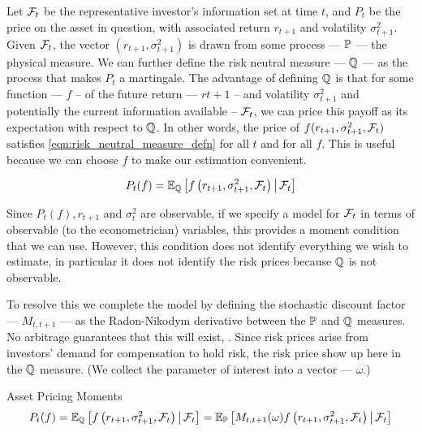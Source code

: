 \documentclass[11pt, letterpaper, twoside, final]{article}
\begin{document}
Let $\mathcal{F}_t$ be the representative investor's information set at time $t$, and $P_t$ be the price on the asset in
question, with associated return $r_{t+1}$ and volatility  $\sigma^2_{t+1}$.
Given $\mathcal{F}_{t}$, the vector $\left( r_{t+1},  \sigma^2_{t+1}\right)$ is drawn from some process --- $\mathbb{P}$ --- the
physical measure. 
We can further define the risk neutral measure --- $\mathbb{Q}$ ---  as the process that makes $P_t$ a martingale.
The advantage of defining $\mathbb{Q}$ is that for some function --- $f$ -- of the future return --- $r{t+1}$   -- 
and volatility $\sigma^2_{t+1}$ and potentially the current information available --
$\mathcal{F}_t$, we can price this payoff as its expectation with respect to $\mathbb{Q}$.
In other  words, the price of $f(r_{t+1}, \sigma^2_{t+1}, \mathcal{F}_t)$ satisfies \cref{eqn:risk_neutral_measure_defn}
for all $t$ and for all $f$.  
This is useful because we can choose $f$ to make our estimation convenient.

\begin{equation}
    P_t(f) = \operatorname{\mathbb{E}}_{\mathbb{Q}}\left[ f\left(r_{t+1}, \sigma^2_{t+1}, \mathcal{F}_{t}\right)  \,\middle\vert\, \mathcal{F}_{t}\right]
    \label{eqn:risk_neutral_measure_defn}
\end{equation}

Since $P_t(f), r_{t+1}$ and $\sigma_t^2$ are observable, if we specify a model for $\mathcal{F}_t$ in terms of observable
(to the econometrician) variables, this provides a moment condition that we can use. 
However, this condition does not identify everything we wish to estimate, in particular it does not identify the
risk prices because $\mathbb{Q}$ is not observable.

To resolve this we complete the model by defining the stochastic discount factor --- $M_{t, t+1}$ --- as the
Radon-Nikodym derivative between the $\mathbb{P}$ and $\mathbb{Q}$ measures. 
No arbitrage guarantees that this will exist, \parencite{harrison1978martingales}.
Since risk prices arise from investors' demand for compensation to hold risk, the risk price show up here 
in the $\mathbb{Q}$ measure. 
(We collect the parameter of interest into a vector --- $\omega$.)


\begin{defn}{Asset Pricing Moments}
    \begin{equation}
        P_t(f)  = \operatorname{\mathbb{E}}_{\mathbb{Q}} \left[f\left(r_{t+1}, \sigma^2_{t+1} , \mathcal{F}_t\right) \,\middle\vert\, \mathcal{F}_t \right] =
        \operatorname{\mathbb{E}}_{\mathbb{P}}\left[M_{t,t+1}(\omega)f\left(r_{t+1}, \sigma^2_{t+1}, \mathcal{F}_t\right) \,\middle\vert\, \mathcal{F}_t \right] 
    \end{equation}
\end{defn}
\end{document}
